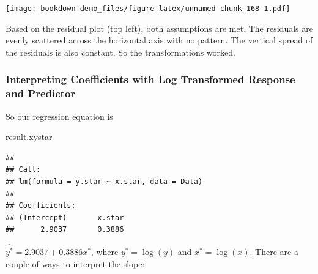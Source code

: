 \documentclass[
]{book}
\newenvironment{Shaded}{\begin{snugshade}}{\end{snugshade}}
\newcommand{\AttributeTok}[1]{\textcolor[rgb]{0.13,0.29,0.53}{#1}}
\newcommand{\DecValTok}[1]{\textcolor[rgb]{0.00,0.00,0.81}{#1}}
\newcommand{\DocumentationTok}[1]{\textcolor[rgb]{0.56,0.35,0.01}{\textbf{\textit{#1}}}}
\newcommand{\FunctionTok}[1]{\textcolor[rgb]{0.13,0.29,0.53}{\textbf{#1}}}
\newcommand{\NormalTok}[1]{#1}
\newcommand{\OtherTok}[1]{\textcolor[rgb]{0.56,0.35,0.01}{#1}}
\newcommand{\SpecialCharTok}[1]{\textcolor[rgb]{0.81,0.36,0.00}{\textbf{#1}}}
\begin{document}
\begin{Shaded}
\end{Shaded}

\texttt{[image: bookdown-demo\_files/figure-latex/unnamed-chunk-168-1.pdf]}

Based on the residual plot (top left), both assumptions are met. The residuals are evenly scattered across the horizontal axis with no pattern. The vertical spread of the residuals is also constant. So the transformations worked.

\hypertarget{interpreting-coefficients-with-log-transformed-response-and-predictor}{%
\subsubsection*{Interpreting Coefficients with Log Transformed Response and Predictor}\label{interpreting-coefficients-with-log-transformed-response-and-predictor}}

So our regression equation is

\begin{Shaded}
\begin{Highlighting}[]
\NormalTok{result.xystar}
\end{Highlighting}
\end{Shaded}

\begin{verbatim}
## 
## Call:
## lm(formula = y.star ~ x.star, data = Data)
## 
## Coefficients:
## (Intercept)       x.star  
##      2.9037       0.3886
\end{verbatim}

\(\hat{y^*} = 2.9037 + 0.3886x^{*}\), where \(y^* = \log(y)\) and \(x^* = \log(x)\). There are a couple of ways to interpret the slope:
\end{document}
